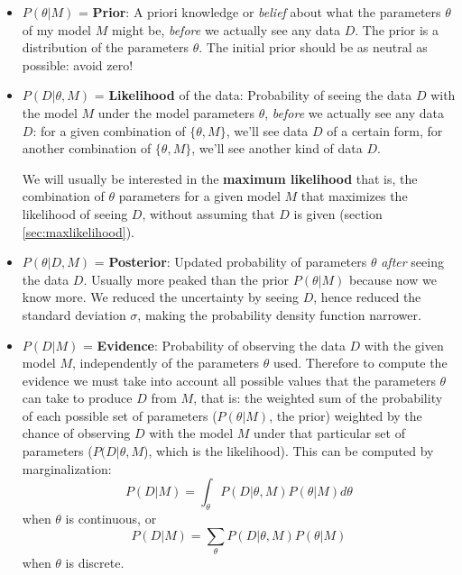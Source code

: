 \begin{itemize}

\item
$P(\theta|M)$ = {\bf Prior}:
A priori knowledge or {\em belief} about what the parameters $\theta$ of my model $M$ might be,
{\em before} we actually see any data $D$.
The prior is a distribution of the parameters $\theta$.
The initial prior should be as neutral as possible: avoid zero!

\item
$P(D|\theta,M)$ = {\bf Likelihood} of the data:
Probability of seeing the data $D$ with the model $M$ under the model parameters $\theta$, {\em before} we actually see any data $D$: for a given combination of $\{\theta,M\}$, we'll see data $D$ of a certain form, for another combination of $\{\theta,M\}$, we'll see another kind of data $D$.

We will usually be interested in the {\bf maximum likelihood} that is, the combination of $\theta$ parameters for a given model $M$ that maximizes the likelihood of seeing $D$, without assuming that $D$ is given (section \ref{sec:maxlikelihood}).

\item
$P(\theta|D,M)$ = {\bf Posterior}:
Updated probability of parameters $\theta$ {\em after} seeing the data $D$.
Usually more peaked than the prior $P(\theta|M)$ because now we know more.
We reduced the uncertainty by seeing $D$, hence reduced the standard deviation $\sigma$, making the probability density function narrower.

\item
$P(D|M)$ = {\bf Evidence}:
Probability of observing the data $D$ with the given model $M$, independently of the parameters $\theta$ used. Therefore to compute the evidence we must take into account all possible values that the parameters $\theta$ can take to produce $D$ from $M$, that is: the weighted sum of the probability of each possible set of parameters ($P(\theta|M)$, the prior) weighted by the chance of observing $D$ with the model $M$ under that particular set of parameters ($P(D|\theta,M$), which is the likelihood). This can be computed by marginalization:
%
\begin{equation}
P(D|M) = \int_\theta P(D|\theta,M) P(\theta|M) d\theta
\label{eq:evidencemarg1}
\end{equation}
when $\theta$ is continuous, or
\begin{equation}
P(D|M) = \sum_\theta P(D|\theta,M) P(\theta|M)
\label{eq:evidencemarg2}
\end{equation}
when $\theta$ is discrete.

\end{itemize}

